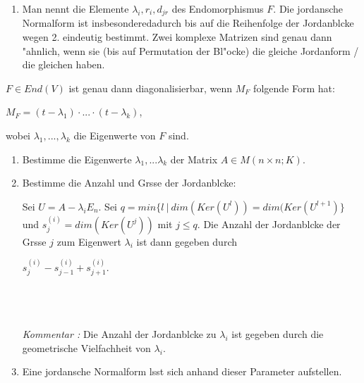 \documentclass[9pt, a4paper, twocolumn, landscape]{article}
\begin{document}
\begin{theorem}
\begin{enumerate}
{Es gilt $1 \leq d_i \leq \mu (M_F, \lambda_i)$ f\uee r $\forall i$.  Der gr\oee sste Jordanblock hat dabei genau die Gr\oee sse $\mu (M_F, \lambda_i)$.
}

\item Man nennt die Elemente $\lambda_i, r_i, d_{jr}$  des Endomorphismus $F$. Die jordansche Normalform ist insbesonderedadurch  bis auf die Reihenfolge der Jordanbl\oee cke wegen 2. eindeutig bestimmt. Zwei komplexe Matrizen sind genau dann "ahnlich, wenn sie (bis auf Permutation der Bl"ocke) die gleiche Jordanform / die gleichen  haben.
\end{enumerate}
\end{theorem}

\begin{corollary}
$F \in End(V)$ ist genau dann diagonalisierbar, wenn $M_F$ folgende Form hat:
\\ \centerline{$M_F = (t - \lambda_1) \cdot ... \cdot (t - \lambda_k)$,}
wobei $\lambda_1, ... , \lambda_k$ die Eigenwerte von $F$ sind.
\end{corollary}

\begin{remark}
\begin{enumerate}
\item Bestimme die Eigenwerte $\lambda_1, ... \lambda_k$ der Matrix $A \in M(n \times n; K)$.
\item Bestimme die Anzahl und Gr\oee sse der Jordanbl\oee cke:

Sei $U = A - \lambda_i E_n$.
Sei $q= min\{l \ | \ dim(Ker(U^l)) = dim(Ker(U^{l+1})\}$ und $s_j^{(i)} = dim(Ker(U^j))$ mit $j \leq q$.
Die Anzahl der Jordanbl\oee cke der Gr\oee sse $j$ zum Eigenwert $\lambda_i$ ist dann gegeben durch 
\\ \centerline{$s_j^{(i)} - s_{j-1}^{(i)} +s_{j+1}^{(i)}.$}
\\
\\
\\ \textit{Kommentar :} Die Anzahl der Jordanbl\oee cke zu $\lambda_i$ ist gegeben durch die geometrische Vielfachheit von $\lambda_i$.
\item Eine jordansche Normalform l\aee sst sich anhand dieser Parameter aufstellen.
\end{enumerate}
\end{remark}
\end{document}
